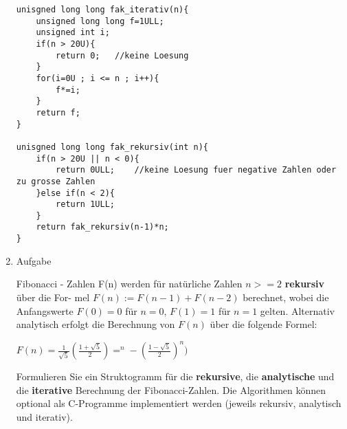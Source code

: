 \documentclass[12pt,a4paper]{scrreprt}
\begin{document}
\begin{enumerate}
\begin{comment}
- (in)E: n
- (cond)? n>=0
- (f:back:in)
- (cond)? n=>2
- (f:out) A: 1
- (fin) f=1
- i=2
- f=f*i
\end{comment}

\begin{lstlisting}
unisgned long long fak_iterativ(n){
	unsigned long long f=1ULL;
	unsigned int i;
	if(n > 20U){
		return 0;	//keine Loesung
	}
	for(i=0U ; i <= n ; i++){
		f*=i;
	}
	return f;
}

unisgned long long fak_rekursiv(int n){
	if(n > 20U || n < 0){
		return 0ULL;	//keine Loesung fuer negative Zahlen oder zu grosse Zahlen
	}else if(n < 2){
		return 1ULL;
	}
	return fak_rekursiv(n-1)*n;
}
\end{lstlisting}

\item Aufgabe %

Fibonacci - Zahlen F(n) werden für natürliche Zahlen $n>=2$ \textbf{rekursiv} über die For-
mel $F(n) := F(n-1) + F(n-2)$ berechnet, wobei die Anfangswerte $F(0)=0$ für $n=0$, $F(1)=1$ für
$n=1$ gelten. Alternativ analytisch erfolgt die Berechnung von $F(n)$ über die folgende Formel:

$F(n)=\frac{1}{\sqrt{5}} (\frac{1+\sqrt{5}}{2})=^{n} - (\frac{1-\sqrt{5}}{2})^{n})$

Formulieren Sie ein Struktogramm für die \textbf{rekursive}, die \textbf{analytische} und die \textbf{iterative} Berechnung der Fibonacci-Zahlen. Die Algorithmen können optional als C-Programme implementiert werden (jeweils rekursiv, analytisch und iterativ).

\begin{comment}
algo rekursiv:
F(4) = F(3) + F(2)
     = F(2)+F(1) + F(1)+F(0)
     = 1+1 + 1+0

fibr:
(n>=0)f: A:Fehler
(n>0)f: A:0
(n>1)f: A:1
fibr(n-1)+fibr(n-2)

\begin{lstlisting}
unsigned long long(unsigned char n){
	if(n==0U)return 0ULL;
	if(n==1U)return 1ULL;
	return fibr(n-1U)+fibr(n-2U);
}
\end{lstlisting}

algo iterativ:
fibi:
(n>=0)f: Fehler
vorgaenger=1
vorvorgaenger=0
zaehler=1
(inc)zaehler++
(i<=n)f: A:zahl
zahl=vorgaenger+vorvorgaenger
back:inc

fibi:


\end{comment}
\end{enumerate}
\end{document}
